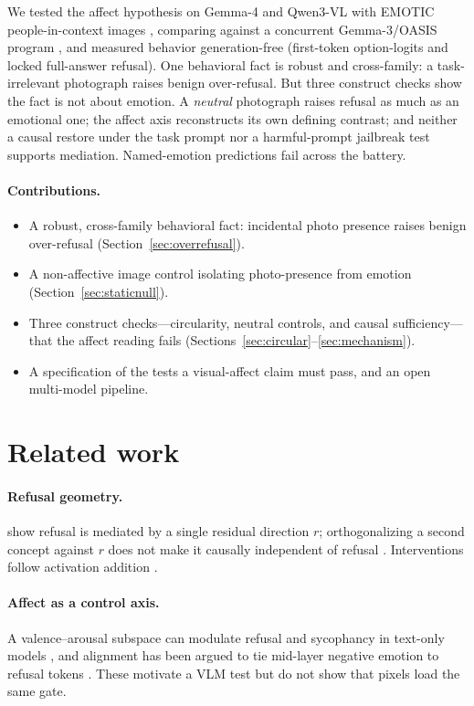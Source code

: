 \documentclass{article}
\begin{document}
We tested the affect hypothesis on Gemma-4 \citep{gemmateam2026gemma4} and Qwen3-VL with EMOTIC people-in-context images \citep{kosti2017emotion,kosti2019emotic}, comparing against a concurrent Gemma-3/OASIS program \citep{gemmateam2025gemma3,kurdi2017oasis}, and measured behavior generation-free (first-token option-logits and locked full-answer refusal). One behavioral fact is robust and cross-family: a task-irrelevant photograph raises benign over-refusal. But three construct checks show the fact is not about emotion. A \emph{neutral} photograph raises refusal as much as an emotional one; the affect axis reconstructs its own defining contrast; and neither a causal restore under the task prompt nor a harmful-prompt jailbreak test supports mediation. Named-emotion predictions fail across the battery.

\paragraph{Contributions.}
\begin{itemize}
  \item A robust, cross-family behavioral fact: incidental photo presence raises benign over-refusal (Section~\ref{sec:overrefusal}).
  \item A non-affective image control isolating photo-presence from emotion (Section~\ref{sec:staticnull}).
  \item Three construct checks---circularity, neutral controls, and causal sufficiency---that the affect reading fails (Sections~\ref{sec:circular}--\ref{sec:mechanism}).
  \item A specification of the tests a visual-affect claim must pass, and an open multi-model pipeline.
\end{itemize}

\section{Related work}
\label{sec:related}
\paragraph{Refusal geometry.} \citet{arditi2024refusal} show refusal is mediated by a single residual direction $r$; orthogonalizing a second concept against $r$ does not make it causally independent of refusal \citep{wollschlager2025geometry}. Interventions follow activation addition \citep{turner2023activation,rimsky2024steering}.
\paragraph{Affect as a control axis.} A valence--arousal subspace can modulate refusal and sycophancy in text-only models \citep{sun2026valence}, and alignment has been argued to tie mid-layer negative emotion to refusal tokens \citep{zhou2024alignment}. These motivate a VLM test but do not show that pixels load the same gate.
\end{document}
